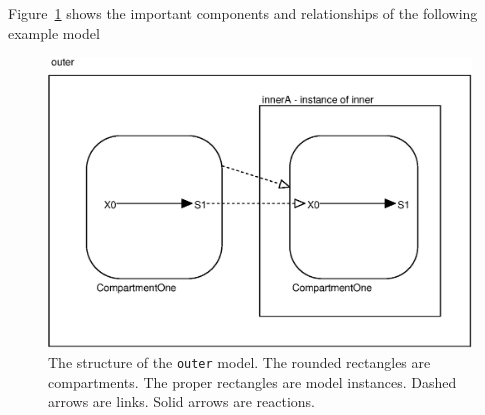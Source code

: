 \documentclass{cekarticle}
\begin{document}
Figure~\ref{fig:eg} shows the important components and relationships of the following example model
\begin{figure}[h]
  \vspace*{8pt}
  \centering
  \includegraphics[scale = 0.7]{eg}
  \caption{The structure of the \texttt{outer} model.
  The rounded rectangles are compartments.
  The proper rectangles are model instances. Dashed arrows are links.
  Solid arrows are reactions.}
  \label{fig:eg}
\end{figure}

\pagebreak
\end{document}
